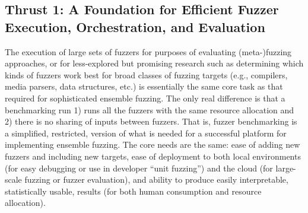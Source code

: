 \subsection{Thrust 1: A Foundation for Efficient Fuzzer Execution,
Orchestration, and Evaluation}

The execution of large sets of fuzzers for purposes of evaluating
(meta-)fuzzing approaches, or for less-explored but promising research such as
determining which kinds of fuzzers work best for broad classes of fuzzing
targets (e.g., compilers, media parsers, data structures, etc.) is essentially
the same core task as that required for sophisticated ensemble fuzzing.  The
only real difference is that a benchmarking run 1) runs all the fuzzers with
the same resource allocation and 2) there is no sharing of inputs between
fuzzers.  That is, fuzzer benchmarking is a simplified, restricted, version of
what is needed for a successful platform for implementing ensemble fuzzing.
The core needs are the same: ease of adding new fuzzers and including new
targets, ease of deployment to both local environments (for easy debugging or
use in developer ``unit fuzzing'') and the cloud (for large-scale fuzzing or
fuzzer evaluation), and ability to produce easily interpretable, statistically
usable, results (for both human consumption and resource allocation).


